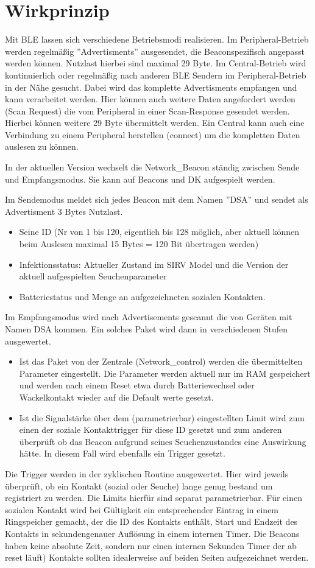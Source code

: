 \documentclass[11pt,ngerman]{scrartcl} %
\begin{document}
\section{Wirkprinzip}
Mit BLE lassen sich verschiedene Betriebsmodi realisieren. Im Peripheral-Betrieb werden regelmäßig ''Advertisments'' ausgesendet, die Beaconspezifisch angepasst werden können. Nutzlast hierbei sind maximal 29 Byte. Im Central-Betrieb wird kontinuierlich oder regelmäßig nach anderen BLE Sendern im Peripheral-Betrieb in der Nähe gesucht. Dabei wird das komplette Advertisments empfangen und kann verarbeitet werden. Hier können auch weitere Daten angefordert werden (Scan Request) die vom Peripheral in einer Scan-Response gesendet werden. Hierbei können weitere 29 Byte übermittelt werden. Ein Central kann auch eine Verbindung zu einem Peripheral herstellen  (connect) um die kompletten Daten auslesen zu können.

In der aktuellen Version wechselt die Network\_Beacon ständig zwischen Sende und Empfangsmodus. Sie kann auf Beacons und DK aufgespielt werden.

Im Sendemodus  meldet sich jedes Beacon mit dem Namen ''DSA'' und sendet als Advertisment 3 Bytes Nutzlast. 
\begin{itemize}
\item Seine ID (Nr von 1 bis 120, eigentlich bis 128 möglich, aber aktuell können beim Auslesen maximal 15 Bytes = 120 Bit übertragen werden)
\item Infektionsstatus: Aktueller Zustand im SIRV Model und die Version der aktuell aufgespielten Seuchenparameter
\item Batteriestatus und Menge an aufgezeichneten sozialen Kontakten.
\end{itemize}

Im Empfangsmodus wird nach Advertisements gescannt die von Geräten mit Namen DSA kommen. Ein solches Paket wird dann in verschiedenen Stufen ausgewertet.
\begin{itemize}
\item Ist das Paket von der Zentrale (Network\_control) werden die übermittelten Parameter eingestellt. Die Parameter werden aktuell nur im RAM gespeichert und werden nach einem Reset etwa durch Batteriewechsel oder Wackelkontakt wieder auf die Default werte gesetzt. 
\item Ist die Signalstärke über dem (parametrierbar) eingestellten Limit wird zum einen der soziale Kontakttrigger für diese ID gesetzt und zum anderen überprüft ob das Beacon aufgrund seines Seuchenzustandes eine Auswirkung hätte. In diesem Fall wird ebenfalls ein Trigger gesetzt.
\end{itemize}
Die Trigger werden in der zyklischen Routine ausgewertet. Hier wird jeweils überprüft, ob ein Kontakt (sozial oder Seuche) lange genug bestand um registriert zu werden. Die Limits hierfür sind separat parametrierbar. Für einen sozialen Kontakt wird bei Gültigkeit ein entsprechender Eintrag in einem Ringspeicher gemacht, der die ID des Kontakts enthält, Start und Endzeit des Kontakts in sekundengenauer Auflösung in einem internen Timer. Die Beacons haben keine absolute Zeit, sondern nur einen internen Sekunden Timer der ab reset läuft) Kontakte sollten idealerweise auf beiden Seiten aufgezeichnet werden.
\end{document}
